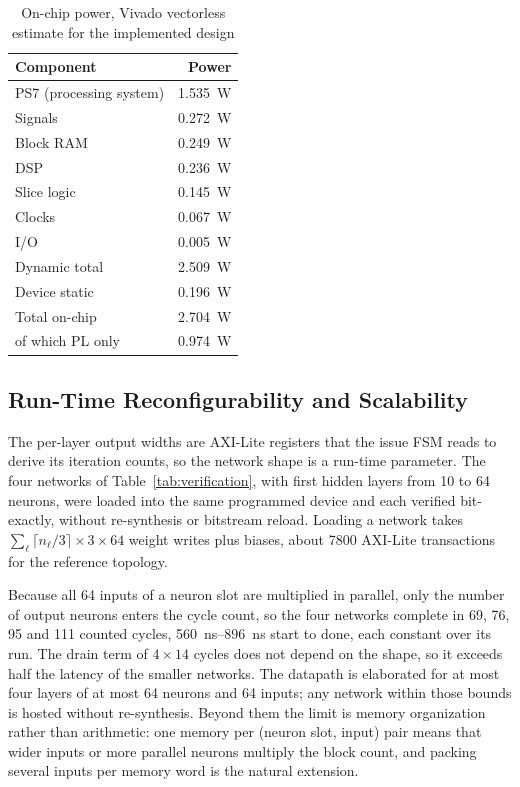 \documentclass[final,5p,times,twocolumn]{elsarticle}
\begin{document}
\begin{table}[htbp]
\centering
\caption{On-chip power, Vivado vectorless estimate for the implemented design}
\label{tab:power}
\begin{tabular}{lr}
\toprule
Component & Power \\
\midrule
PS7 (processing system) & \SI{1.535}{\watt} \\
Signals                 & \SI{0.272}{\watt} \\
Block RAM               & \SI{0.249}{\watt} \\
DSP                     & \SI{0.236}{\watt} \\
Slice logic             & \SI{0.145}{\watt} \\
Clocks                  & \SI{0.067}{\watt} \\
I/O                     & \SI{0.005}{\watt} \\
\midrule
Dynamic total           & \SI{2.509}{\watt} \\
Device static           & \SI{0.196}{\watt} \\
\midrule
Total on-chip           & \SI{2.704}{\watt} \\
\quad of which PL only  & \SI{0.974}{\watt} \\
\bottomrule
\end{tabular}
\end{table}

\subsection{Run-Time Reconfigurability and Scalability}
\label{sec:reconfig}
The per-layer output widths are AXI-Lite registers that the issue FSM reads to
derive its iteration counts, so the network shape is a run-time parameter. The
four networks of Table~\ref{tab:verification}, with first hidden layers from 10
to 64 neurons, were loaded into the same programmed device and each verified
bit-exactly, without re-synthesis or bitstream reload. Loading a network takes
$\sum_\ell\lceil n_\ell/3\rceil \times 3 \times 64$ weight writes plus biases,
about \num{7800} AXI-Lite transactions for the reference topology.

Because all 64 inputs of a neuron slot are multiplied in parallel, only the
number of output neurons enters the cycle count, so the four networks complete
in 69, 76, 95 and 111 counted cycles, \SIrange{560}{896}{\nano\second} start to
done, each constant over its run. The drain term of $4\times14$ cycles does not
depend on the shape, so it exceeds half the latency of the smaller networks.
The datapath is elaborated for at most four layers of at most 64 neurons and 64
inputs; any network within those bounds is hosted without re-synthesis. Beyond
them the limit is memory organization rather than arithmetic: one memory per
(neuron slot, input) pair means that wider inputs or more parallel neurons
multiply the block count, and packing several inputs per memory word is the
natural extension.
\end{document}
